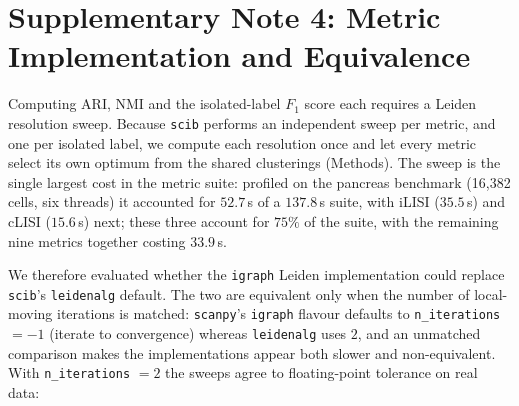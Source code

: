 \documentclass[11pt, a4paper]{article}
\begin{document}
\section*{Supplementary Note 4: Metric Implementation and Equivalence}

Computing ARI, NMI and the isolated-label $F_1$ score each requires a Leiden resolution
sweep. Because \texttt{scib} performs an independent sweep per metric, and one per
isolated label, we compute each resolution once and let every metric select its own
optimum from the shared clusterings (Methods). The sweep is the single largest cost in
the metric suite: profiled on the pancreas benchmark (16{,}382 cells, six threads) it
accounted for $52.7$\,s of a $137.8$\,s suite, with iLISI ($35.5$\,s) and cLISI
($15.6$\,s) next; these three account for $75\%$ of the suite, with the remaining nine
metrics together costing $33.9$\,s.

We therefore evaluated whether the \texttt{igraph} Leiden implementation could replace
\texttt{scib}'s \texttt{leidenalg} default. The two are equivalent only when the number
of local-moving iterations is matched: \texttt{scanpy}'s \texttt{igraph} flavour defaults
to \texttt{n\_iterations} $=-1$ (iterate to convergence) whereas \texttt{leidenalg} uses
$2$, and an unmatched comparison makes the implementations appear both slower and
non-equivalent. With \texttt{n\_iterations} $=2$ the sweeps agree to floating-point
tolerance on real data:
\end{document}

